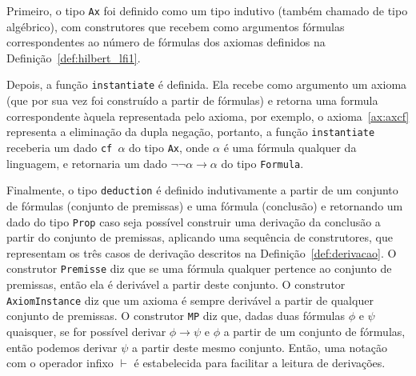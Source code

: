               Primeiro, o tipo \texttt{Ax} foi definido como um tipo indutivo (também chamado de tipo algébrico), com construtores que recebem como argumentos fórmulas correspondentes ao número de fórmulas dos axiomas definidos na Definição~\ref{def:hilbert_lfi1}. 
              
              Depois, a função \texttt{instantiate} é definida. Ela recebe como argumento um axioma (que por sua vez foi construído a partir de fórmulas) e retorna uma formula correspondente àquela representada pelo axioma, por exemplo, o axioma~\ref{ax:axcf} representa a eliminação da dupla negação, portanto, a função \texttt{instantiate} receberia um dado \texttt{cf $\alpha$} do tipo \texttt{Ax}, onde $\alpha$ é uma fórmula qualquer da linguagem, e retornaria um dado $\neg\neg\alpha \to \alpha$ do tipo \texttt{Formula}.

              Finalmente, o tipo \texttt{deduction} é definido indutivamente a partir de um conjunto de fórmulas (conjunto de premissas) e uma fórmula (conclusão) e retornando um dado do tipo \texttt{Prop} caso seja possível construir uma derivação da conclusão a partir do conjunto de premissas, aplicando uma sequência de construtores, que representam os três casos de derivação descritos na Definição~\ref{def:derivacao}. O construtor \texttt{Premisse} diz que se uma fórmula qualquer pertence ao conjunto de premissas, então ela é derivável a partir deste conjunto. O construtor \texttt{AxiomInstance} diz que um axioma é sempre derivável a partir de qualquer conjunto de premissas. O construtor \texttt{MP} diz que, dadas duas fórmulas $\phi$ e $\psi$ quaisquer, se for possível derivar $\phi \to \psi$ e $\phi$ a partir de um conjunto de fórmulas, então podemos derivar $\psi$ a partir deste mesmo conjunto. Então, uma notação com o operador infixo $\vdash$ é estabelecida para facilitar a leitura de derivações.